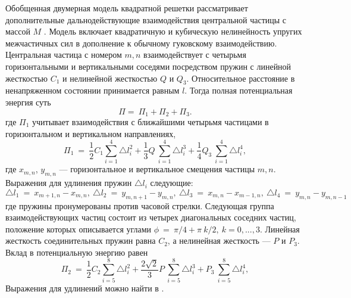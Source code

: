 Обобщенная двумерная модель квадратной решетки рассматривает дополнительные дальнодействующие взаимодействия центральной частицы с массой $M$ \cite{porkros}. Модель включает квадратичную и кубическую нелинейность упругих межчастичных сил в дополнение к обычному гуковскому взаимодействию.
Центральная частица с номером ${m, n}$ взаимодействует с четырьмя горизонтальными и вертикальными соседями посредством пружин с линейной жесткостью $C_1$ и нелинейной жесткостью $Q$ и $Q_3$. Относительное расстояние в ненапряженном состоянии принимается равным $l$. 
Тогда полная потенциальная энергия суть
\[
\Pi=~\Pi_1+\Pi_2+\Pi_3.
\]
где $\Pi_1 $ учитывает взаимодействия с ближайшими четырьмя частицами в горизонтальном и вертикальном направлениях,
\[
\Pi_1~=~\frac{1}{2} C_1 \sum_{i=1}^{4}\triangle l_i^2+\frac{1}{3} Q~ \sum_{i=1}^{4}\triangle l_i^3+\frac{1}{4} Q_3~ \sum_{i=1}^{4}\triangle l_i^4,
\]
где $x_{m, n}$, $y_{m, n} $ --- горизонтальное и вертикальное смещения частицы $m, n$. Выражения для удлинения пружин $\triangle l_i$ следующие: \cite {porkros}
\[
\triangle l_1~=~x_{m+1,n}-x_{m,n},~ \triangle l_2~=~y_{m,n+1}-y_{m,n},~\triangle l_3~=~x_{m,n}-x_{m-1,n},~ \triangle l_4~=~y_{m,n}-y_{m,n-1}
\]
где пружины пронумерованы против часовой стрелки. Следующая группа взаимодействующих частиц состоит из четырех диагональных соседних частиц, положение которых описывается углами $\phi~=~\pi/4+ \pi~k/2, ~k=0,...,3$. Линейная жесткость соединительных пружин равна $C_2$, а нелинейная жесткость --- $P$ и $P_3$. Вклад в потенциальную энергию равен
\[
\Pi_2~=~\frac{1}{2} C_2 \sum_{i=5}^{8}\triangle l_i^2+\frac{2\sqrt{2}}{3} P~ \sum_{i=5}^{8}\triangle l_i^3+ P_3~ \sum_{i=5}^{8}\triangle l_i^4,
\]
Выражения для удлинений можно найти в \cite {porkros}.

